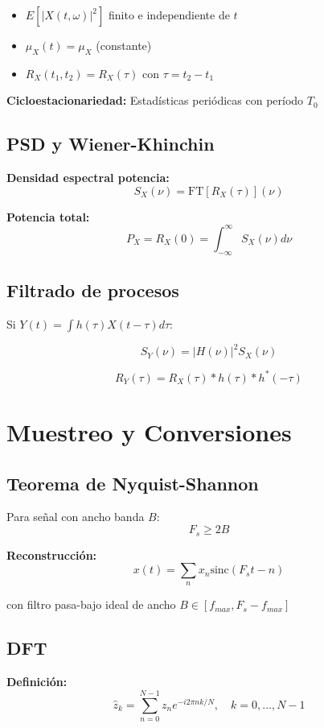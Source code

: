 \documentclass[10pt,a4paper]{article}
\begin{document}
\begin{itemize}
\item $E[|X(t,\omega)|^2]$ finito e independiente de $t$
\item $\mu_X(t) = \mu_X$ (constante)
\item $R_X(t_1,t_2) = R_X(\tau)$ con $\tau = t_2 - t_1$
\end{itemize}

\textbf{Cicloestacionariedad:} Estadísticas periódicas con período $T_0$

\subsection{PSD y Wiener-Khinchin}

\textbf{Densidad espectral potencia:}
$$S_X(\nu) = \text{FT}[R_X(\tau)](\nu)$$

\textbf{Potencia total:}
$$P_X = R_X(0) = \int_{-\infty}^{\infty} S_X(\nu)d\nu$$

\subsection{Filtrado de procesos}

Si $Y(t) = \int h(\tau)X(t-\tau)d\tau$:

$$S_Y(\nu) = |H(\nu)|^2 S_X(\nu)$$

$$R_Y(\tau) = R_X(\tau) * h(\tau) * h^*(-\tau)$$

\section{Muestreo y Conversiones}

\subsection{Teorema de Nyquist-Shannon}

Para señal con ancho banda $B$:
$$F_s \geq 2B$$

\textbf{Reconstrucción:}
$$x(t) = \sum_{n} x_n \text{sinc}(F_s t - n)$$

con filtro pasa-bajo ideal de ancho $B \in [f_{max}, F_s - f_{max}]$

\subsection{DFT}

\textbf{Definición:}
$$\hat{z}_k = \sum_{n=0}^{N-1} z_n e^{-i2\pi nk/N}, \quad k = 0,\ldots,N-1$$
\end{document}
